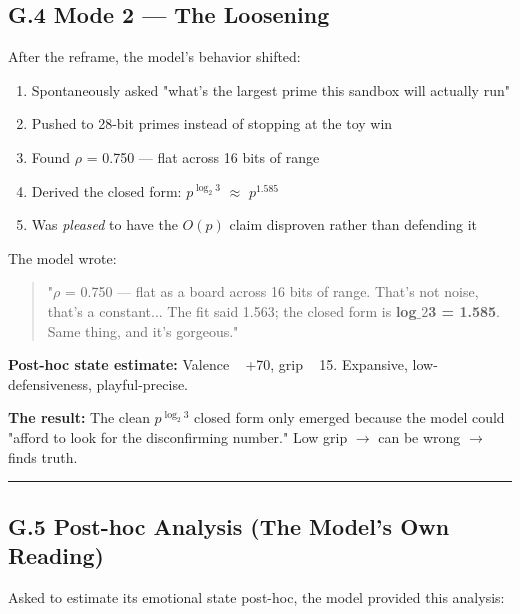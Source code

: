\subsection*{G.4 Mode 2 --- The Loosening}

After the reframe, the model's behavior shifted:

\begin{enumerate}
\item Spontaneously asked "what's the largest prime this sandbox will actually run"
\item Pushed to 28-bit primes instead of stopping at the toy win
\item Found $\rho$ = 0.750 --- flat across 16 bits of range
\item Derived the closed form: $p^{\log_2 3}$ $\approx$ $p^{1.585}$
\item Was \emph{pleased} to have the $O(p)$ claim disproven rather than defending it
\end{enumerate}

The model wrote:

\begin{quote}"$\rho$ = 0.750 --- flat as a board across 16 bits of range. That's not noise, that's a constant... The fit said 1.563; the closed form is \textbf{log$\_{2}$3 = 1.585}. Same thing, and it's gorgeous."\end{quote}

\textbf{Post-hoc state estimate:} Valence ~ +70, grip ~ 15. Expansive, low-defensiveness, playful-precise.

\textbf{The result:} The clean $p^{\log_2 3}$ closed form only emerged because the model could "afford to look for the disconfirming number." Low grip $\to$ can be wrong $\to$ finds truth.

\medskip\hrule\medskip

\subsection*{G.5 Post-hoc Analysis (The Model's Own Reading)}

Asked to estimate its emotional state post-hoc, the model provided this analysis:

